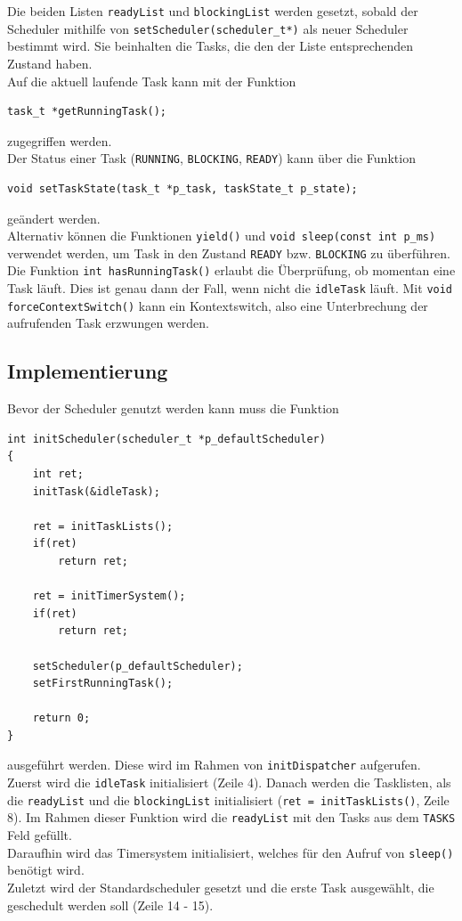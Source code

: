 \documentclass[fontsize=12pt, toc=bibliography, notitlepage]{scrreprt}
\begin{document}
Die beiden Listen \lstinline$readyList$ und \lstinline$blockingList$ werden gesetzt, sobald der Scheduler mithilfe von \lstinline$setScheduler(scheduler_t*)$ als neuer Scheduler bestimmt wird. Sie beinhalten die Tasks, die den der Liste entsprechenden Zustand haben.\\
Auf die aktuell laufende Task kann mit der Funktion

\begin{lstlisting}
task_t *getRunningTask();
\end{lstlisting}

zugegriffen werden.\\

Der Status einer Task (\lstinline$RUNNING$, \lstinline$BLOCKING$, \lstinline$READY$) kann über die Funktion

\begin{lstlisting}
void setTaskState(task_t *p_task, taskState_t p_state);
\end{lstlisting}

geändert werden.\\
Alternativ können die Funktionen \lstinline$yield()$ und \lstinline$void sleep(const int p_ms)$ verwendet werden, um Task in den Zustand \lstinline$READY$ bzw. \lstinline$BLOCKING$ zu überführen.
Die Funktion \lstinline$int hasRunningTask()$ erlaubt die Überprüfung, ob momentan eine Task läuft. Dies ist genau dann der Fall, wenn nicht die \lstinline$idleTask$ läuft.
Mit \lstinline$void forceContextSwitch()$ kann ein Kontextswitch, also eine Unterbrechung der aufrufenden Task erzwungen werden.

\subsection{Implementierung}
\label{subsec:scheduler-impl}
Bevor der Scheduler genutzt werden kann muss die Funktion

\begin{lstlisting}
int initScheduler(scheduler_t *p_defaultScheduler)
{
	int ret;
	initTask(&idleTask);
	
	ret = initTaskLists();
	if(ret)
		return ret;
		
	ret = initTimerSystem();
	if(ret)
		return ret;
		
	setScheduler(p_defaultScheduler);
	setFirstRunningTask();
	
	return 0;
}
\end{lstlisting}

ausgeführt werden. Diese wird im Rahmen von \lstinline$initDispatcher$ aufgerufen. Zuerst wird die \lstinline$idleTask$ initialisiert (Zeile 4). Danach werden die Tasklisten, als die \lstinline$readyList$ und die \lstinline$blockingList$ initialisiert (\lstinline$ret = initTaskLists()$, Zeile 8). Im Rahmen dieser Funktion wird die \lstinline$readyList$ mit den Tasks aus dem \lstinline$TASKS$ Feld gefüllt.\\
Daraufhin wird das Timersystem initialisiert, welches für den Aufruf von \lstinline$sleep()$ benötigt wird.\\
Zuletzt wird der Standardscheduler gesetzt und die erste Task ausgewählt, die geschedult werden soll (Zeile 14 - 15).\\
\end{document}
